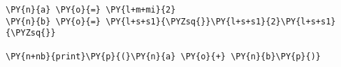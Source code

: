 \begin{Verbatim}[label=\makebox{\href{https://github.com/unipi-physics-labs/lab1-notes/tree/main/snippy/integer_string.py}{https://github.com/.../integer\_string.py}},commandchars=\\\{\}]
\PY{n}{a} \PY{o}{=} \PY{l+m+mi}{2}
\PY{n}{b} \PY{o}{=} \PY{l+s+s1}{\PYZsq{}}\PY{l+s+s1}{2}\PY{l+s+s1}{\PYZsq{}}

\PY{n+nb}{print}\PY{p}{(}\PY{n}{a} \PY{o}{+} \PY{n}{b}\PY{p}{)}
\end{Verbatim}
